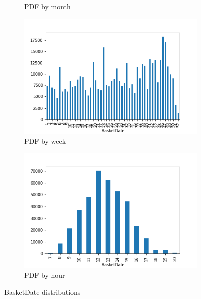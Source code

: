 \begin{figure}[!h]
\begin{subfigure}{.33\textwidth}
\caption{PDF by month}
\label{fig:month_bar}
\end{subfigure}
\begin{subfigure}{.33\textwidth}
\centering
\includegraphics[width=.7\textwidth]{img/week_bar.png}
\caption{PDF by week}
\label{fig:week_bar}
\end{subfigure}
\begin{subfigure}{.33\textwidth}
\centering
\includegraphics[width=.7\textwidth]{img/hour_bar.png}
\caption{PDF by hour}
\label{fig:hour_bar}
\end{subfigure}
\caption{BasketDate distributions}
\end{figure}

